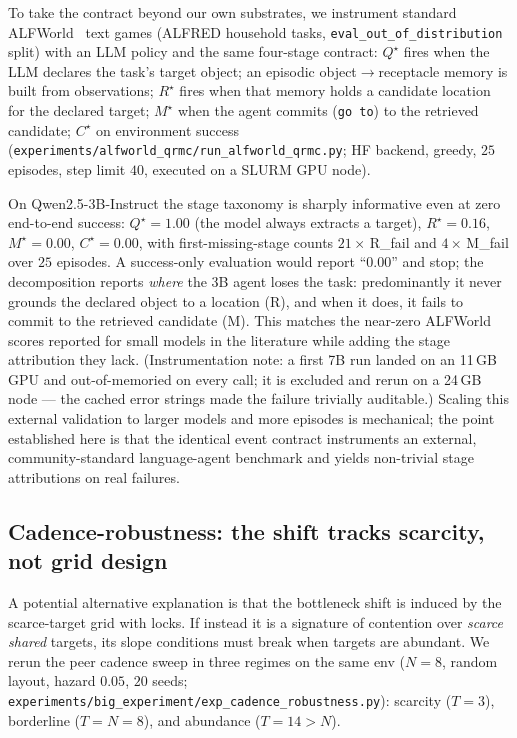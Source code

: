 \documentclass{article}
\newcommand{\method}[1]{\texttt{#1}}
\begin{document}
To take the contract beyond our own substrates, we instrument standard
ALFWorld~\citep{shridhar2021alfworld} text games (ALFRED household tasks,
\texttt{eval\_out\_of\_distribution} split) with an LLM policy and the same
four-stage contract: $Q^\star$ fires when the LLM declares the task's target
object; an episodic object$\to$receptacle memory is built from observations;
$R^\star$ fires when that memory holds a candidate location for the declared
target; $M^\star$ when the agent commits (\texttt{go to}) to the retrieved
candidate; $C^\star$ on environment success
(\method{experiments/alfworld\_qrmc/run\_alfworld\_qrmc.py}; HF backend, greedy,
$25$ episodes, step limit $40$, executed on a SLURM GPU node).

On Qwen2.5-3B-Instruct the stage taxonomy is sharply informative even at zero
end-to-end success: $Q^\star{=}1.00$ (the model always extracts a target),
$R^\star{=}0.16$, $M^\star{=}0.00$, $C^\star{=}0.00$, with first-missing-stage
counts $21\times$\,R\_fail and $4\times$\,M\_fail over $25$ episodes. A success-only
evaluation would report ``$0.00$'' and stop; the decomposition reports
\emph{where} the 3B agent loses the task: predominantly it never grounds the
declared object to a location (R), and when it does, it fails to commit to the
retrieved candidate (M). This matches the near-zero ALFWorld scores reported
for small models in the literature while adding the stage attribution they
lack. (Instrumentation note: a first 7B run landed on an 11\,GB GPU and
out-of-memoried on every call; it is excluded and rerun on a 24\,GB node ---
the cached error strings made the failure trivially auditable.) Scaling this
external validation to larger models and more episodes is mechanical; the
point established here is that the identical event contract instruments an
external, community-standard language-agent benchmark and yields non-trivial
stage attributions on real failures.

\subsection{Cadence-robustness: the shift tracks scarcity, not grid design}
\label{p1:app:cadence-robustness}

A potential alternative explanation is that the bottleneck shift is induced by the scarce-target
grid with locks. If instead it is a signature of contention over \emph{scarce
shared} targets, its slope conditions must break when targets are abundant. We
rerun the peer cadence sweep in three regimes on the same env ($N{=}8$, random
layout, hazard $0.05$, $20$ seeds; \method{experiments/big\_experiment/exp\_cadence\_robustness.py}):
scarcity ($T{=}3$), borderline ($T{=}N{=}8$), and abundance ($T{=}14{>}N$).
\end{document}
